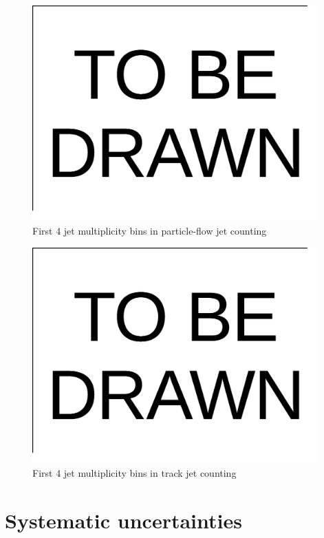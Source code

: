 \documentclass{cmspaper}
\begin{document}
\begin{figure}[hbtp]
   \begin{center}
  \includegraphics[width=110mm]{TOBEDRAWN}
   \caption{First 4 jet multiplicity bins in particle-flow jet counting}
   \label{Figure_PFJetFit}
   \end{center}
\end{figure}

\begin{figure}[hbtp]
   \begin{center} 
  \includegraphics[width=110mm]{TOBEDRAWN}
   \caption{First 4 jet multiplicity bins in track jet counting}
   \label{Figure_TrackJetFit}
   \end{center}
\end{figure}

\section{Systematic uncertainties}
\end{document}
